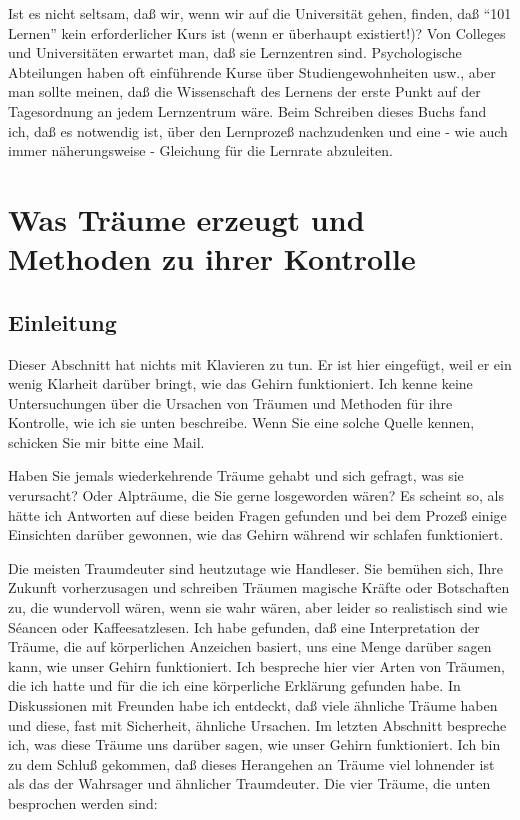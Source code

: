 Ist es nicht seltsam, daß wir, wenn wir auf die Universität gehen, finden, daß \enquote{101 Lernen} kein erforderlicher Kurs ist (wenn er überhaupt existiert!)?
 Von Colleges und Universitäten erwartet man, daß sie Lernzentren sind.
 Psychologische Abteilungen haben oft einführende Kurse über Studiengewohnheiten usw., aber man sollte meinen, daß die Wissenschaft des Lernens der erste Punkt auf der Tagesordnung an jedem Lernzentrum wäre.
 Beim Schreiben dieses Buchs fand ich, daß es notwendig ist, über den Lernprozeß nachzudenken und eine - wie auch immer näherungsweise - Gleichung für die Lernrate abzuleiten.
 
\hypertarget{c3_5}{}

\section{Was Träume erzeugt und Methoden zu ihrer Kontrolle}\hypertarget{c3_5a}{}

\subsection{Einleitung}

Dieser Abschnitt hat nichts mit Klavieren zu tun.
 Er ist hier eingefügt, weil er ein wenig Klarheit darüber bringt, wie das Gehirn funktioniert.
 Ich kenne keine Untersuchungen über die Ursachen von Träumen und Methoden für ihre Kontrolle, wie ich sie unten beschreibe.
 Wenn Sie eine solche Quelle kennen, schicken Sie mir bitte eine Mail.
 

Haben Sie jemals wiederkehrende Träume gehabt und sich gefragt, was sie verursacht?
 Oder Alpträume, die Sie gerne losgeworden wären?
 Es scheint so, als hätte ich Antworten auf diese beiden Fragen gefunden und bei dem Prozeß einige Einsichten darüber gewonnen, wie das Gehirn während wir schlafen funktioniert.
 

Die meisten Traumdeuter sind heutzutage wie Handleser.
 Sie bemühen sich, Ihre Zukunft vorherzusagen und schreiben Träumen magische Kräfte oder Botschaften zu, die wundervoll wären, wenn sie wahr wären, aber leider so realistisch sind wie S\'eancen oder Kaffeesatzlesen.
 Ich habe gefunden, daß eine Interpretation der Träume, die auf körperlichen Anzeichen basiert, uns eine Menge darüber sagen kann, wie unser Gehirn funktioniert.
 Ich bespreche hier vier Arten von Träumen, die ich hatte und für die ich eine körperliche Erklärung gefunden habe.
 In Diskussionen mit Freunden habe ich entdeckt, daß viele ähnliche Träume haben und diese, fast mit Sicherheit, ähnliche Ursachen.
 Im letzten Abschnitt bespreche ich, was diese Träume uns darüber sagen, wie unser Gehirn funktioniert.
 Ich bin zu dem Schluß gekommen, daß dieses Herangehen an Träume viel lohnender ist als das der Wahrsager und ähnlicher Traumdeuter.
 Die vier Träume, die unten besprochen werden sind:
 
